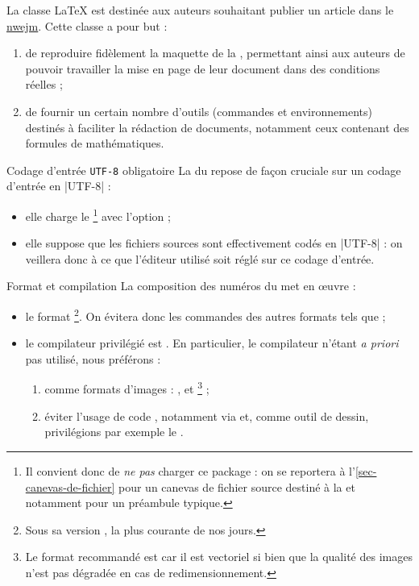 \documentclass[french,nolocaltoc]{nwejmart}
\newtheorem[title=Fait,style=definition]{fact}
\begin{document}
La classe \LaTeX{} \nwejmauthor{} est destinée aux auteurs souhaitant publier un
article dans le \href{http://math.univ-lille1.fr/~nwejm/}{\gls{nwejm}}. Cette
classe a pour but :
\begin{enumerate}
\item de reproduire fidèlement la maquette de la \nwejm{}, permettant ainsi
  aux auteurs de pouvoir travailler la mise en page de leur document dans des
  conditions réelles ;
\item de fournir un certain nombre d'outils (commandes et environnements)
  destinés à faciliter la rédaction de documents, notamment ceux contenant des
  formules de mathématiques.
\end{enumerate}

\begin{dbwarning}{Codage d'entrée \protect\lstinline+UTF-8+ obligatoire}{}
  La \nwejmauthorcl{} du \nwejm{} repose de façon cruciale sur un codage
  d'entrée en |UTF-8| :
  \begin{itemize}
  \item elle charge le \footnote{%
      Il convient donc de \emph{ne pas} charger ce package : on se reportera
      à l'\vref{sec-canevas-de-fichier} pour un canevas de fichier source
      destiné à la \nwejm{} et notamment pour un préambule typique.%
    }
    avec l'option  ;
  \item elle suppose que les fichiers sources  sont effectivement
    codés en |UTF-8| : on veillera donc à ce que l'éditeur utilisé soit réglé
    sur ce codage d'entrée.
  \end{itemize}
\end{dbwarning}

\begin{dbwarning}{Format et compilation }{}
  La composition des numéros du \nwejm*{} met en œuvre :
  \begin{itemize}
  \item le format \footnote{Sous sa version , la
      plus courante de nos jours.}. On évitera donc les commandes des autres
    formats tels que  ;
  \item le compilateur privilégié est . En particulier, le
    compilateur  n'étant \emph{a priori} pas utilisé, nous
    préférons :
    \begin{enumerate}
    \item comme formats d'images : ,  et
      \footnote{Le format recommandé est  car il est
        vectoriel si bien que la qualité des images n'est pas dégradée en cas de
        redimensionnement.} ;
    \item éviter l'usage de code , notamment via
       et, comme outil de dessin, privilégions par exemple le
      .
    \end{enumerate}
  \end{itemize}
\end{dbwarning}
\end{document}
